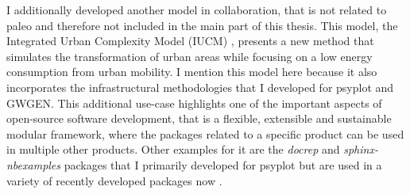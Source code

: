\begin{refsection}
I additionally developed another model in collaboration, that is not related to paleo and therefore not included in the main part of this thesis. This model, the Integrated Urban Complexity Model (IUCM) \citep{CremadesSommer2019}, presents a new method that simulates the transformation of urban areas while focusing on a low energy consumption from urban mobility. I mention this model here because it also incorporates the infrastructural methodologies that I developed for psyplot and GWGEN. This additional use-case highlights one of the important aspects of open-source software development, that is a flexible, extensible and sustainable modular framework, where the packages related to a specific product can be used in multiple other products. Other examples for it are the \textit{docrep} and \textit{sphinx-nbexamples} packages \citep{Sommer2018a, Sommer2018c} that I primarily developed for psyplot but are used in a variety of recently developed packages now \citep[e.g.][]{AbernatheyUchidaBuseckeEtAl2017, BanihirweLongAltuntasEtAl2019, Uchida2018}.

\printbibliography[heading=subbibintoc]

\end{refsection}
